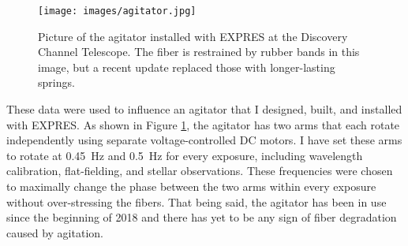 \documentclass[11pt]{article}
\begin{document}
\begin{figure}
    \centering
    \texttt{[image: images/agitator.jpg]}
    \caption{Picture of the agitator installed with EXPRES at the Discovery Channel Telescope. The fiber is restrained by rubber bands in this image, but a recent update replaced those with longer-lasting springs.}
    \label{fig:agitator}
\end{figure}

These data were used to influence an agitator that I designed, built, and installed with EXPRES. As shown in Figure \ref{fig:agitator}, the agitator has two arms that each rotate independently using separate voltage-controlled DC motors. I have set these arms to rotate at \SI{0.45}{\hertz} and \SI{0.5}{\hertz} for every exposure, including wavelength calibration, flat-fielding, and stellar observations. These frequencies were chosen to maximally change the phase between the two arms within every exposure without over-stressing the fibers. That being said, the agitator has been in use since the beginning of 2018 and there has yet to be any sign of fiber degradation caused by agitation.
\end{document}
